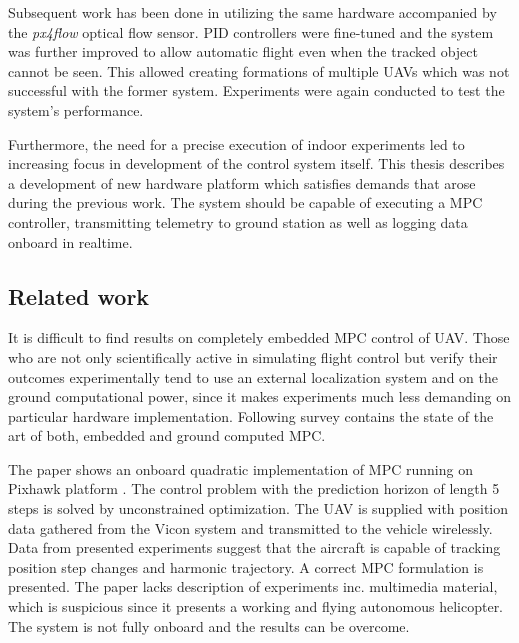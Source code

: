 Subsequent work has been done in \citep{endrych2014} utilizing the same hardware accompanied by the \textit{px4flow} optical flow sensor. PID controllers were fine-tuned and the system was further improved to allow automatic flight even when the tracked object cannot be seen. This allowed creating formations of multiple UAVs which was not successful with the former system. Experiments were again conducted to test the system's performance.

Furthermore, the need for a precise execution of indoor experiments led to increasing focus in development of the control system itself. This thesis describes a development of new hardware platform which satisfies demands that arose during the previous work. The system should be capable of executing a MPC controller, transmitting telemetry to ground station as well as logging data onboard in realtime. 

\subsection{Related work}
\label{cap:related_work}

It is difficult to find results on completely embedded MPC control of UAV. Those who are not only scientifically active in simulating flight control but verify their outcomes experimentally tend to use an external localization system and on the ground computational power, since it makes experiments much less demanding on particular hardware implementation. Following survey contains the state of the art of both, embedded and ground computed MPC.

The paper \citep{bangura2014realtimempc} shows an onboard quadratic implementation of MPC running on Pixhawk platform \citep{pixhawk}. The control problem with the prediction horizon of length 5 steps is solved by unconstrained optimization. The UAV is supplied with position data gathered from the Vicon system and transmitted to the vehicle wirelessly. Data from presented experiments suggest that the aircraft is capable of tracking position step changes and harmonic trajectory. A correct MPC formulation is presented. The paper lacks description of experiments inc. multimedia material, which is suspicious since it presents a working and flying autonomous helicopter. The system is not fully onboard and the results can be overcome.

